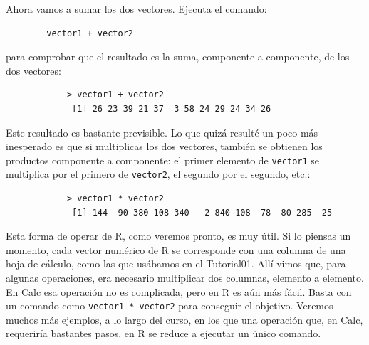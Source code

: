 \documentclass[10pt,a4paper]{article}\usepackage[]{graphicx}\usepackage[]{color}
\begin{document}
Ahora vamos a sumar los dos vectores. Ejecuta el comando:
        \begin{verbatim}
        vector1 + vector2
        \end{verbatim}
para comprobar que el resultado es la suma, componente a componente, de los dos vectores:
        \begin{verbatim}
            > vector1 + vector2
             [1] 26 23 39 21 37  3 58 24 29 24 34 26
        \end{verbatim}
Este resultado es bastante previsible. Lo que quizá resulté un poco más inesperado es que si multiplicas los dos vectores, también se obtienen los productos componente a componente: el  primer elemento de {\tt vector1} se multiplica por el primero de {\tt vector2}, el segundo por el segundo, etc.:
        \begin{verbatim}
            > vector1 * vector2
             [1] 144  90 380 108 340   2 840 108  78  80 285  25
         \end{verbatim}
Esta forma de operar de R, como veremos pronto, es muy útil. Si lo piensas un momento, cada vector numérico de R se corresponde con una columna de una hoja de cálculo, como las que usábamos en el Tutorial01. Allí vimos que, para algunas operaciones, era necesario multiplicar dos columnas, elemento a elemento. En Calc esa operación no es complicada, pero en R es aún más fácil. Basta con un comando como {\tt vector1 * vector2} para conseguir el objetivo. Veremos muchos más ejemplos, a lo largo del curso, en los que una operación que, en Calc, requeriría bastantes pasos, en R se reduce a ejecutar un único comando.
\end{document}
